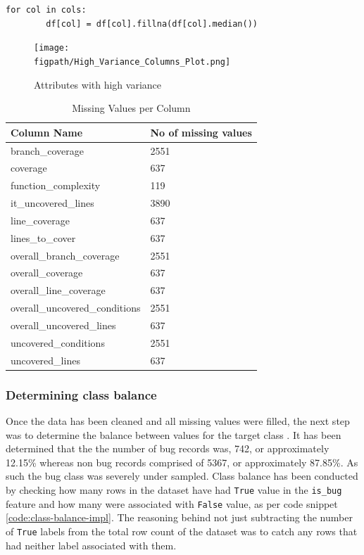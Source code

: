 \begin{code}
\label{code:missing-values-median-code}
\begin{verbatim}
for col in cols:
        df[col] = df[col].fillna(df[col].median())
\end{verbatim}
\end{code}

\begin{figure}[h!]
    \centering
    \texttt{[image: \\figpath/High\_Variance\_Columns\_Plot.png]}
    \caption{Attributes with high variance}
    \label{fig:high-variance}
\end{figure}

\begin{table}[h!]
\centering
\caption{Missing Values per Column}
\label{tbl:missing-values-per-col}
\begin{tabular}{@{}ll@{}}
\toprule
Column Name & No of missing values \\ \midrule
branch\_coverage & 2551 \\
coverage & 637 \\
function\_complexity & 119 \\
it\_uncovered\_lines & 3890 \\
line\_coverage & 637 \\
lines\_to\_cover & 637 \\
overall\_branch\_coverage & 2551 \\
overall\_coverage & 637 \\
overall\_line\_coverage & 637 \\
overall\_uncovered\_conditions & 2551 \\
overall\_uncovered\_lines & 637 \\
uncovered\_conditions & 2551 \\
uncovered\_lines & 637 \\ \bottomrule
\end{tabular}
\end{table}
\FloatBarrier

\subsubsection{Determining class balance}\label{sec:impl-data-analysis:class-balance}
Once the data has been cleaned and all missing values were filled, the next step was to determine the balance between values for the target class \isBug{}. It has been determined that the the number of bug records was, 742, or approximately 12.15\% whereas non bug records comprised of 5367, or approximately 87.85\%. As such the bug class was severely under sampled. Class balance has been conducted by checking how many rows in the dataset have had \texttt{True} value in the \texttt{is\_bug} feature and how many were associated with \texttt{False} value, as per code snippet \ref{code:class-balance-impl}. The reasoning behind not just subtracting the number of \texttt{True} labels from the total row count of the dataset was to catch any rows that had neither label associated with them.

